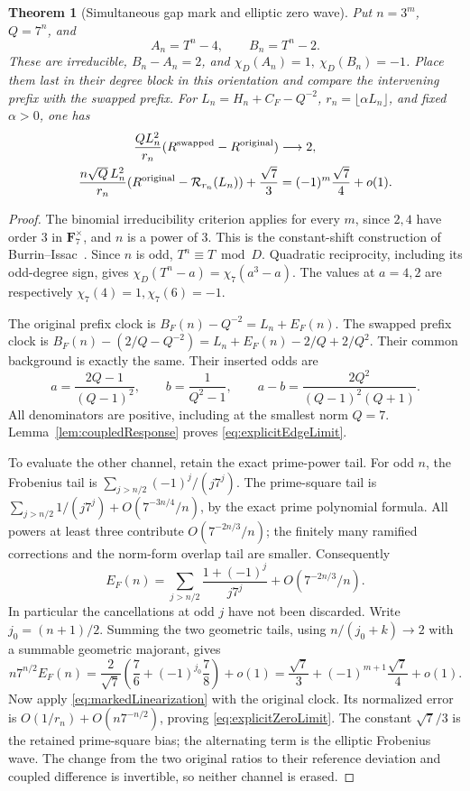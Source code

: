 \documentclass[11pt]{article}
\newtheorem{theorem}{Theorem}[section]
\newcommand{\F}{\mathbf F}
\begin{document}
\begin{theorem}[Simultaneous gap mark and elliptic zero wave]
\label{thm:explicitMarkedWave}
Put \(n=3^m\), \(Q=7^n\), and
\[
                  A_n=T^n-4,\qquad B_n=T^n-2.
\]
These are irreducible, \(B_n-A_n=2\), and
\(\chi_D(A_n)=1,\ \chi_D(B_n)=-1\).
Place them last in their degree block in this orientation and compare
the intervening prefix with the swapped prefix.
For \(L_n=H_n+C_F-Q^{-2}\),
\(r_n=\lfloor\alpha L_n\rfloor\), and fixed \(\alpha>0\), one has
\begin{align}
 \frac{Q L_n^2}{r_n}(R^{\rm swapped}-R^{\rm original})&\longrightarrow2,
 \label{eq:explicitEdgeLimit}\\
 \frac{n\sqrt Q\,L_n^2}{r_n}
       (R^{\rm original}-{\cal R}_{r_n}(L_n))
       +\frac{\sqrt7}{3}
 &=(-1)^m\frac{\sqrt7}{4}+o(1).
 \label{eq:explicitZeroLimit}
\end{align}
\end{theorem}
\begin{proof}
The binomial irreducibility criterion applies for every \(m\), since
\(2,4\) have order \(3\) in \(\F_7^\times\), and \(n\) is a power
of \(3\). This is the constant-shift construction of
Burrin--Issac~\cite{BurrinIssac}.
Since \(n\) is odd, \(T^n\equiv T\bmod D\).
Quadratic reciprocity, including its odd-degree sign, gives
\(\chi_D(T^n-a)=\chi_7(a^3-a)\).
The values at \(a=4,2\) are respectively
\(\chi_7(4)=1,\chi_7(6)=-1\).

The original prefix clock is \(B_F(n)-Q^{-2}=L_n+E_F(n)\).
The swapped prefix clock is
\(B_F(n)-(2/Q-Q^{-2})=L_n+E_F(n)-2/Q+2/Q^2\).
Their common background is exactly the same. Their inserted odds are
\[
 a=\frac{2Q-1}{(Q-1)^2},\qquad b=\frac1{Q^2-1},\qquad
 a-b=\frac{2Q^2}{(Q-1)^2(Q+1)}.
\]
All denominators are positive, including at the smallest norm \(Q=7\).
Lemma~\ref{lem:coupledResponse} proves \eqref{eq:explicitEdgeLimit}.

To evaluate the other channel, retain the exact prime-power tail.
For odd \(n\), the Frobenius tail is
\(\sum_{j>n/2}(-1)^j/(j7^j)\). The prime-square tail is
\(\sum_{j>n/2}1/(j7^j)+O(7^{-3n/4}/n)\), by the exact prime
polynomial formula. All powers at least three contribute
\(O(7^{-2n/3}/n)\); the finitely many ramified corrections and the
norm-form overlap tail are smaller. Consequently
\[
 E_F(n)=\sum_{j>n/2}\frac{1+(-1)^j}{j7^j}
                     +O(7^{-2n/3}/n).
\]
In particular the cancellations at odd \(j\) have not been discarded.
Write \(j_0=(n+1)/2\). Summing the two geometric tails, using
\(n/(j_0+k)\to2\) with a summable geometric majorant, gives
\[
 n7^{n/2}E_F(n)
   =\frac2{\sqrt7}\left(\frac7{6}
                   +(-1)^{j_0}\frac7{8}\right)+o(1)
   =\frac{\sqrt7}{3}+(-1)^{m+1}\frac{\sqrt7}{4}+o(1).
\]
Now apply \eqref{eq:markedLinearization} with the original clock.
Its normalized error is \(O(1/r_n)+O(n7^{-n/2})\), proving
\eqref{eq:explicitZeroLimit}. The constant \(\sqrt7/3\) is the
retained prime-square bias; the alternating term is the elliptic
Frobenius wave. The change from the two original ratios to their
reference deviation and coupled difference is invertible, so neither
channel is erased.
\end{proof}
\end{document}

